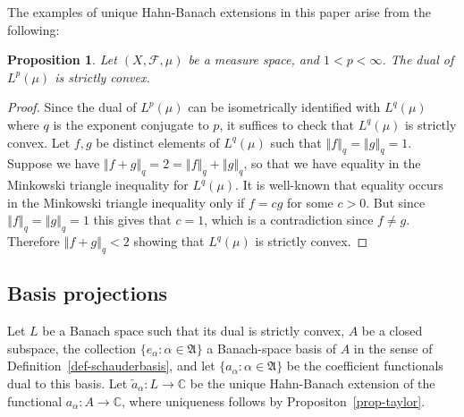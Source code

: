 \documentclass[letterpaper,11pt,reqno]{amsart}
\theoremstyle{plain}
\newtheorem{proposition}[equation]{Proposition}
\newtheorem{corollary}[equation]{Corollary}
\theoremstyle{definition}
\theoremstyle{remark}
\theoremstyle{remark}
\numberwithin{equation}{section}
\newcommand{\norm}[1]{\left\Vert#1\right\Vert}
\newcommand{\wt}{\widetilde}
\newcommand{\cx}{{\mathbb C}}
\begin{document}
The examples of unique Hahn-Banach extensions in this paper arise from the following:
\begin{proposition}\label{prop-lpstrictconvex} 
Let $(X, \mathcal{F},\mu)$ be a measure space, and $1<p <\infty$. The dual of $L^p(\mu)$ is strictly convex. 
\end{proposition}
\begin{proof}
Since the dual of $L^p(\mu)$ can be isometrically identified with $L^q(\mu)$ where $q$ is the exponent conjugate to $p$, it suffices to check that $L^q(\mu)$ is strictly convex. 
Let $f,g$ be distinct elements of $L^q(\mu)$ such that $\norm{f}_{q}=\norm{g}_{q}=1$. Suppose we have $\norm{f+g}_{q} =2= \norm{f}_{q}+\norm{g}_{q}$, so that we have equality in the Minkowski triangle inequality for $L^q(\mu)$. 
It is well-known that equality occurs in the Minkowski triangle inequality only if $f= c g$ for some $c>0$. 
But since $\norm{f}_{q}=\norm{g}_{q}=1$ this gives that $c=1$, which is a contradiction since $f\not =g$. 
Therefore $\norm{f+g}_{q}<2$ showing  that $L^q(\mu)$ is strictly convex. 
\end{proof}

\subsection{Basis projections}\label{SS:basis-projections}
Let $L$ be a Banach space such that its dual is strictly convex, $A$ be a closed subspace, the collection $\{e_\alpha: \alpha\in \mathfrak{A}\}$ a Banach-space basis of $A$ in the sense of Definition~\ref{def-schauderbasis}, and let $\{a_\alpha: \alpha\in \mathfrak{A}\}$ be the coefficient functionals dual to this basis. 
Let $\wt{a}_\alpha: L \to \cx$ be the unique Hahn-Banach extension of the functional $a_\alpha:A\to \cx$, where uniqueness follows by Propositon~\ref{prop-taylor}.
\end{document}

